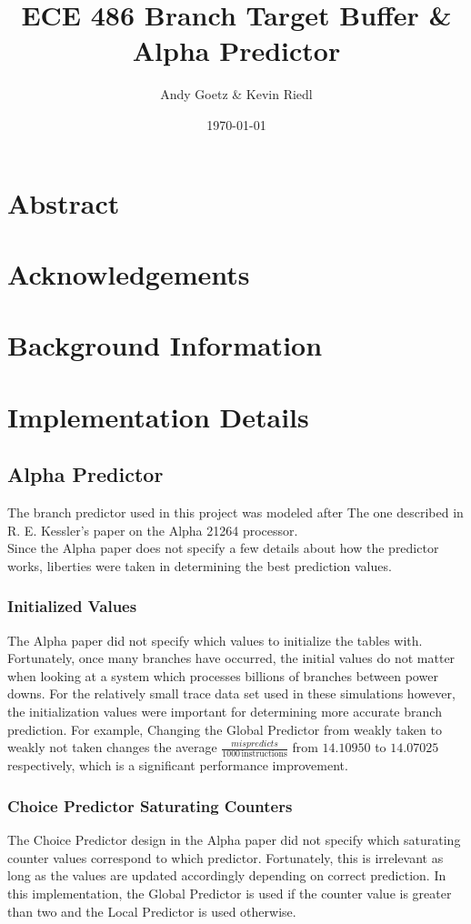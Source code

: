 \documentclass[twocolumn]{article}
\author{\LARGE Andy Goetz \& Kevin Riedl}
\date{\today}
\title{\Huge \textbf{ECE 486 Branch Target Buffer \& Alpha Predictor}}
\begin{document}
\maketitle

\section{Abstract}
\section{Acknowledgements}
\section{Background Information}

\section{Implementation Details}
\subsection{Alpha Predictor}
The branch predictor used in this project was modeled after
The one described in R. E. Kessler's paper on the Alpha 
21264 processor.\\

Since the Alpha paper does not specify a few details about how the predictor
works, liberties were taken in determining the best prediction values. 

\subsubsection{Initialized Values}
The Alpha paper did not specify which values to initialize the tables with.
Fortunately, once many branches have occurred, the initial values do not matter
when looking at a system which processes billions of branches between power downs.
For the relatively small trace data set used in these simulations however,
the initialization values were important for determining more accurate branch prediction.
For example, Changing the Global Predictor from weakly taken to weakly not taken changes 
the average $\frac{mispredicts}{1000\,\text{instructions}}$ from $14.10950$ to $14.07025$
respectively, which is a significant performance improvement.
 
\subsubsection{Choice Predictor Saturating Counters}
The Choice Predictor design in the Alpha paper did not specify which saturating 
counter values correspond to which predictor. Fortunately, this is irrelevant
as long as the values are updated accordingly depending on correct prediction.
In this implementation, the Global Predictor is used if the counter value is 
greater than two and the Local Predictor is used otherwise.
\end{document}

